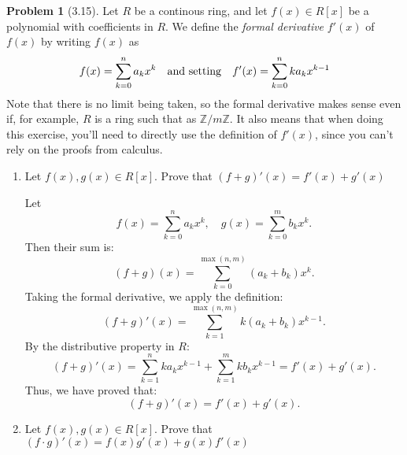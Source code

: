\documentclass[12pt]{article}
\theoremstyle{definition}
\newtheorem{problem}{Problem}
\begin{document}
\begin{problem}[3.15]
    Let $R$ be a continous ring, and let $f(x) \in R[x]$ be a polynomial with coefficients in $R$. We define the \textit{formal derivative} $f'(x)$ of $f(x)$ by writing $f(x)$ as
    \[
        f(x) = \sum_{k=0}^{n}a_{k}x^k \hspace{10px} \text{and setting} \hspace{10px} f'(x) = \sum_{k=0}^{n}ka_{k}x^{k-1}
    \]
    Note that there is no limit being taken, so the formal derivative makes sense even if, for example, $R$ is a ring such that as $\mathbb{Z}/m\mathbb{Z}$. It also means that when
    doing this exercise, you'll need to directly use the definition of $f'(x)$, since you can't rely on the proofs from calculus.
    \begin{enumerate}[label=(\alph*)]
        \item Let $f(x), g(x) \in R[x]$. Prove that $(f + g)'(x) = f'(x) + g'(x)$
        
        \begin{solution}
            Let 
            \[
            f(x) = \sum_{k=0}^{n} a_k x^k, \quad g(x) = \sum_{k=0}^{m} b_k x^k.
            \]
            Then their sum is:
            \[
            (f + g)(x) = \sum_{k=0}^{\max(n, m)} (a_k + b_k) x^k.
            \]
            Taking the formal derivative, we apply the definition:
            \[
            (f + g)'(x) = \sum_{k=1}^{\max(n, m)} k(a_k + b_k) x^{k-1}.
            \]
            By the distributive property in $R$:
            \[
            (f + g)'(x) = \sum_{k=1}^{n} k a_k x^{k-1} + \sum_{k=1}^{m} k b_k x^{k-1} = f'(x) + g'(x).
            \]
            Thus, we have proved that:
            \[
            (f + g)'(x) = f'(x) + g'(x).
            \]
        \end{solution}
        \item Let $f(x), g(x) \in R[x]$. Prove that $(f \cdot g)'(x) = f(x)g'(x) + g(x)f'(x)$
        

\end{enumerate}
\end{problem}
\end{document}
